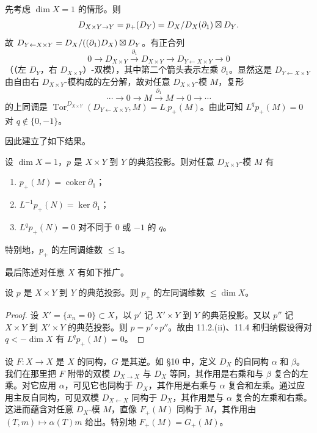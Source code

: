 先考虑 $\dim X=1$ 的情形。则
$$D_{X\times Y\to Y}=p_+(D_Y)=D_X/D_X(\partial_1)\mathbin{\boxtimes} D_Y.$$
故 $D_{Y\leftarrow X\times Y}=D_X/((\partial_1)D_X)\mathbin{\boxtimes} D_Y$。有正合列
$$0\longrightarrow D_{X\times Y}\xrightarrow{\ \partial_1\ }D_{X\times Y}\longrightarrow D_{Y\leftarrow X\times Y}\longrightarrow 0$$
（（左 $D_Y$，右 $D_{X\times Y}$）-双模），其中第二个箭头表示左乘 $\partial_1$。显然这是 $D_{Y\leftarrow X\times Y}$ 由自由右 $D_{X\times Y}$-模构成的左分解，故对任意 $D_{X\times Y}$-模 $M$，复形
$$\cdots\longrightarrow 0\longrightarrow M\xrightarrow{\ \partial_1\ }M\longrightarrow 0\longrightarrow\cdots$$
的上同调是 $\operatorname{Tor}^{D_{X\times Y}}_\cdot(D_{Y\leftarrow X\times Y},M)=L_\cdot p_+(M)$。由此可知 $L^q p_+(M)=0$ 对 $q\notin\{0,-1\}$。

因此建立了如下结果。

\begin{lemma}
设 $\dim X=1$，$p$ 是 $X\times Y$ 到 $Y$ 的典范投影。则对任意 $D_{X\times Y}$-模 $M$ 有
\begin{enumerate}[label=(\roman*)]
  \item $p_+(M)=\operatorname{coker}\partial_1$；
  \item $L^{-1}p_+(N)=\ker\partial_1$；
  \item $L^q p_+(N)=0$ 对不同于 $0$ 或 $-1$ 的 $q$。
\end{enumerate}
特别地，$p_+$ 的左同调维数 $\le 1$。
\end{lemma}

最后陈述对任意 $X$ 有如下推广。

\begin{lemma}
设 $p$ 是 $X\times Y$ 到 $Y$ 的典范投影。则 $p_+$ 的左同调维数 $\le\dim X$。
\end{lemma}

\begin{proof}
设 $X'=\{x_n=0\}\subset X$，以 $p'$ 记 $X'\times Y$ 到 $Y$ 的典范投影。又以 $p''$ 记 $X\times Y$ 到 $X'\times Y$ 的典范投影。则 $p=p'\circ p''$。故由 11.2.(ii)、11.4 和归纳假设得对 $q<-\dim X$ 有 $L^q p_+(M)=0$。
\end{proof}

设 $F:X\to X$ 是 $X$ 的同构，$G$ 是其逆。如 §10 中，定义 $D_X$ 的自同构 $\alpha$ 和 $\beta$。我们在那里把 $F$ 附带的双模 $D_{X\to X}$ 与 $D_X$ 等同，其作用是右乘和与 $\beta$ 复合的左乘。对它应用 $\alpha$，可见它也同构于 $D_X$，其作用是右乘与 $\alpha$ 复合和左乘。通过应用主反自同构，可见双模 $D_{X\leftarrow X}$ 同构于 $D_X$，其作用是与 $\alpha$ 复合的左乘和右乘。这进而蕴含对任意 $D_X$-模 $M$，直像 $F_+(M)$ 同构于 $M$，其作用由 $(T,m)\longmapsto\alpha(T)m$ 给出。特别地 $F_+(M)=G_+(M)$。

